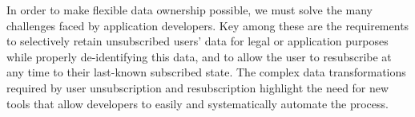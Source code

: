 In order to make flexible data ownership possible, we must solve the many
challenges faced by application developers. Key among these are the requirements to
selectively retain unsubscribed users' data for legal or application purposes while properly
de-identifying this data, and to allow the user to resubscribe at any time to their last-known
subscribed state. The complex data transformations required by user unsubscription and
resubscription highlight the need for new tools that allow developers to easily and systematically
automate the process.

